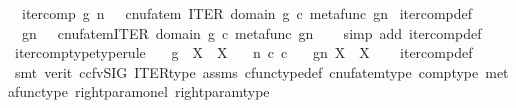 \begin{isabellebody}
\ \ {\isachardoublequoteopen}iter{\isacharunderscore}{\kern0pt}comp\ g\ n\ \ {\isasymequiv}\ cnufatem\ {\isacharparenleft}{\kern0pt}ITER\ {\isacharparenleft}{\kern0pt}domain\ g{\isacharparenright}{\kern0pt}\ {\isasymcirc}\isactrlsub c\ {\isasymlangle}metafunc\ g{\isacharcomma}{\kern0pt}n{\isasymrangle}{\isacharparenright}{\kern0pt}{\isachardoublequoteclose}\isanewline
\isanewline
{}\isamarkupfalse%
\ iter{\isacharunderscore}{\kern0pt}comp{\isacharunderscore}{\kern0pt}def{}{\isacharcolon}{\kern0pt}\ \isanewline
\ \ {\isachardoublequoteopen}g\isactrlbsup {\isasymcirc}n\isactrlesup \ \ {\isasymequiv}\ cnufatem{\isacharparenleft}{\kern0pt}ITER\ {\isacharparenleft}{\kern0pt}domain\ g{\isacharparenright}{\kern0pt}\ {\isasymcirc}\isactrlsub c\ {\isasymlangle}metafunc\ g{\isacharcomma}{\kern0pt}n{\isasymrangle}{\isacharparenright}{\kern0pt}{\isachardoublequoteclose}\isanewline
%
\isadelimproof
\ \ %
\endisadelimproof
%
\isatagproof
{}\isamarkupfalse%
\ {\isacharparenleft}{\kern0pt}simp\ add{\isacharcolon}{\kern0pt}\ iter{\isacharunderscore}{\kern0pt}comp{\isacharunderscore}{\kern0pt}def{\isacharparenright}{\kern0pt}%
\endisatagproof
{\isafoldproof}%
%
\isadelimproof
\isanewline
%
\endisadelimproof
\isanewline
{}\isamarkupfalse%
\ iter{\isacharunderscore}{\kern0pt}comp{\isacharunderscore}{\kern0pt}type{\isacharbrackleft}{\kern0pt}type{\isacharunderscore}{\kern0pt}rule{\isacharbrackright}{\kern0pt}{\isacharcolon}{\kern0pt}\isanewline
\ \ \ {\isachardoublequoteopen}g\ {\isacharcolon}{\kern0pt}\ X\ {\isasymrightarrow}\ X{\isachardoublequoteclose}\isanewline
\ \ \ {\isachardoublequoteopen}n\ {\isasymin}\isactrlsub c\ {\isasymnat}\isactrlsub c{\isachardoublequoteclose}\isanewline
\ \ \ {\isachardoublequoteopen}g\isactrlbsup {\isasymcirc}n\isactrlesup {\isacharcolon}{\kern0pt}\ X\ {\isasymrightarrow}\ X{\isachardoublequoteclose}\isanewline
%
\isadelimproof
\ \ %
\endisadelimproof
%
\isatagproof
{}\isamarkupfalse%
\ iter{\isacharunderscore}{\kern0pt}comp{\isacharunderscore}{\kern0pt}def{}\isanewline
\ \ \isamarkupfalse%
\ {\isacharparenleft}{\kern0pt}smt\ {\isacharparenleft}{\kern0pt}verit{\isacharcomma}{\kern0pt}\ ccfv{\isacharunderscore}{\kern0pt}SIG{\isacharparenright}{\kern0pt}\ ITER{\isacharunderscore}{\kern0pt}type\ assms\ cfunc{\isacharunderscore}{\kern0pt}type{\isacharunderscore}{\kern0pt}def\ cnufatem{\isacharunderscore}{\kern0pt}type\ comp{\isacharunderscore}{\kern0pt}type\ metafunc{\isacharunderscore}{\kern0pt}type\ right{\isacharunderscore}{\kern0pt}param{\isacharunderscore}{\kern0pt}on{\isacharunderscore}{\kern0pt}el\ right{\isacharunderscore}{\kern0pt}param{\isacharunderscore}{\kern0pt}type{\isacharparenright}{\kern0pt}%

\end{isabellebody}
